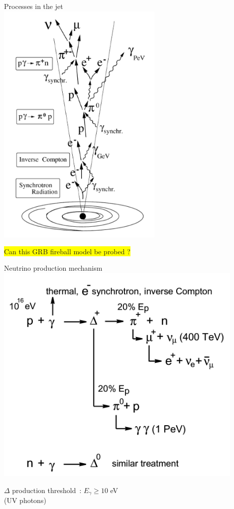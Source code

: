 \Tr
\begin{center}
{\blue Processes in the jet}\\[5mm]
\includegraphics[keepaspectratio,height=12cm]{jet}
\end{center}
%
\colorbox{yellow}{Can this GRB fireball model be probed ?}

\newpage

\begin{center}
{\blue Neutrino production mechanism}\\[5mm]
\includegraphics[keepaspectratio,width=12cm]{grb-engine2}
\end{center}
%
$\Delta$ production threshold~: $E_{\gamma} \ge 10$ eV\\
(UV photons)
